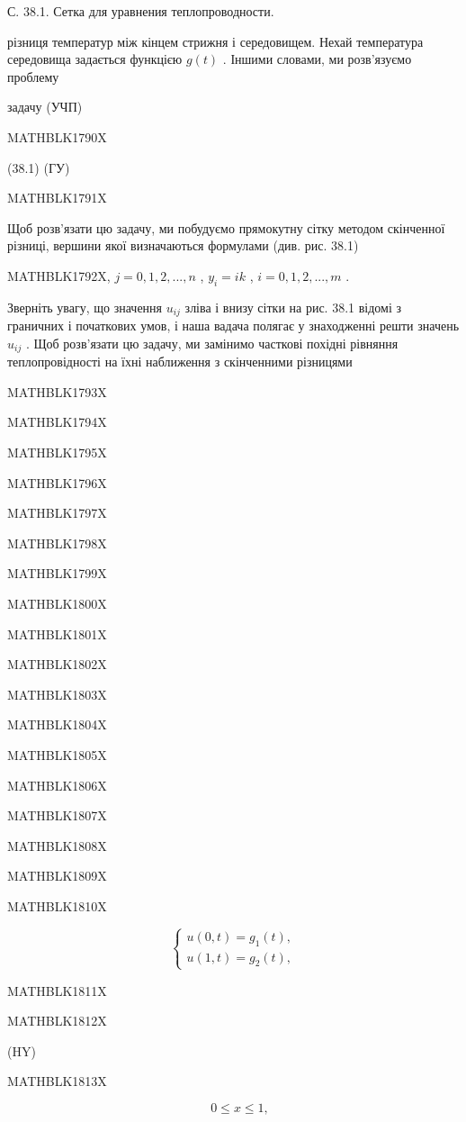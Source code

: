 \documentclass[
  ukrainian,
]{article}
\begin{document}
С. 38.1. Сетка для уравнения теплопроводности.

різниця температур між кінцем стрижня і середовищем. Нехай температура
середовища задається функцією \(g\left(t\right)\) . Іншими словами, ми
розв'язуємо проблему

задачу (УЧП)

MATHBLK1790X

(38.1) (ГУ)

MATHBLK1791X

Щоб розв'язати цю задачу, ми побудуємо прямокутну сітку методом
скінченної різниці, вершини якої визначаються формулами (див. рис. 38.1)

MATHBLK1792X, \(j = 0, 1, 2, ..., n\) , \(y_i = ik\) ,
\(i = 0, 1, 2, ..., m\) .

Зверніть увагу, що значення \(u_{ij}\) зліва і внизу сітки на рис. 38.1
відомі з граничних і початкових умов, і наша вадача полягає у
знаходженні решти значень \(u_{ij}\) . Щоб розв'язати цю задачу, ми
замінимо часткові похідні рівняння теплопровідності на їхні наближення з
скінченними різницями

MATHBLK1793X

MATHBLK1794X

MATHBLK1795X

MATHBLK1796X

MATHBLK1797X

MATHBLK1798X

MATHBLK1799X

MATHBLK1800X

MATHBLK1801X

MATHBLK1802X

MATHBLK1803X

MATHBLK1804X

MATHBLK1805X

MATHBLK1806X

MATHBLK1807X

MATHBLK1808X

MATHBLK1809X

MATHBLK1810X

\[
\begin{cases} u(0, t) = g_1(t), \\ u(1, t) = g_2(t), \end{cases}
\]

MATHBLK1811X

MATHBLK1812X

(HY)

MATHBLK1813X

\[
\quad 0 \leqslant x \leqslant 1,
\]
\end{document}
